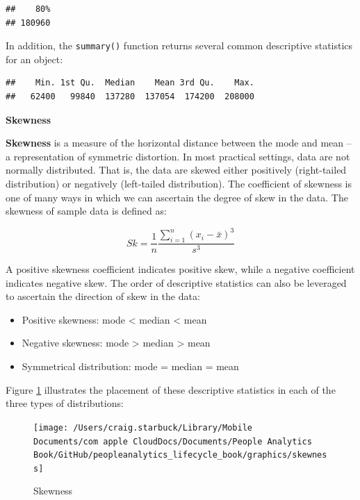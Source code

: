 \documentclass[
]{book}
\newenvironment{Shaded}{\begin{snugshade}}{\end{snugshade}}
\newcommand{\CommentTok}[1]{\textcolor[rgb]{0.56,0.35,0.01}{\textit{#1}}}
\newcommand{\FunctionTok}[1]{\textcolor[rgb]{0.00,0.00,0.00}{#1}}
\newcommand{\NormalTok}[1]{#1}
\newcommand{\SpecialCharTok}[1]{\textcolor[rgb]{0.00,0.00,0.00}{#1}}
\providecommand{\tightlist}{%
  \setlength{\itemsep}{0pt}\setlength{\parskip}{0pt}}
\begin{document}
\begin{verbatim}
##    80% 
## 180960
\end{verbatim}

In addition, the \texttt{summary()} function returns several common descriptive statistics for an object:

\begin{Shaded}
\end{Shaded}

\begin{verbatim}
##    Min. 1st Qu.  Median    Mean 3rd Qu.    Max. 
##   62400   99840  137280  137054  174200  208000
\end{verbatim}

\textbf{Skewness}

\textbf{Skewness} is a measure of the horizontal distance between the mode and mean -- a representation of symmetric distortion. In most practical settings, data are not normally distributed. That is, the data are skewed either positively (right-tailed distribution) or negatively (left-tailed distribution). The coefficient of skewness is one of many ways in which we can ascertain the degree of skew in the data. The skewness of sample data is defined as:

\[ Sk = \frac{1}{n} \frac{\displaystyle\sum_{i=1}^{n} (x_i-\bar{x})^3}{s^3} \]

A positive skewness coefficient indicates positive skew, while a negative coefficient indicates negative skew. The order of descriptive statistics can also be leveraged to ascertain the direction of skew in the data:

\begin{itemize}
\tightlist
\item
  Positive skewness: mode \textless{} median \textless{} mean
\item
  Negative skewness: mode \textgreater{} median \textgreater{} mean
\item
  Symmetrical distribution: mode = median = mean
\end{itemize}

Figure \ref{fig:skewness} illustrates the placement of these descriptive statistics in each of the three types of distributions:

\begin{figure}

{\centering \texttt{[image: /Users/craig.starbuck/Library/Mobile Documents/com~apple~CloudDocs/Documents/People Analytics Book/GitHub/peopleanalytics\_lifecycle\_book/graphics/skewness]} 

}

\caption{Skewness}\label{fig:skewness}
\end{figure}
\end{document}
